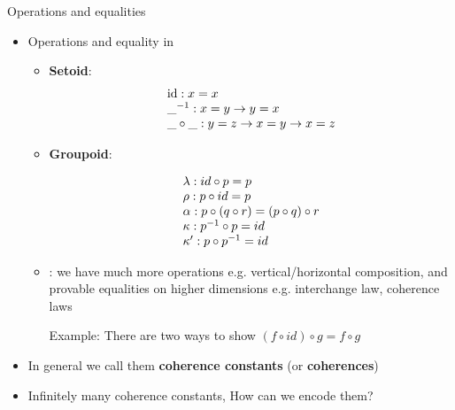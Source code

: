 \documentclass[12pt, mathserif,handout]{beamer}
\begin{document}
\begin{frame}[allowframebreaks,c]{Operations and equalities}

\begin{itemize}

\item Operations and equality in

\begin{itemize}

\item \textbf{Setoid}: 
\begin{equation*}
\begin{array}[b]{l} 
\text{id} : x = x \\
\_^{-1} : x= y \to y  = x \\
\_ \circ\_ : y = z \to x = y \to x = z
 \end{array}
\end{equation*}

\item \textbf{Groupoid}: 

\begin{equation*}
\begin{array}[b]{l}
\lambda : id \circ p = p \\
\rho : p \circ id = p \\
\alpha : p \circ (q \circ r) = (p \circ q) \circ r \\
\kappa : p^{-1}\circ p = id \\
\kappa' : p \circ p^{-1} = id
 \end{array}
\end{equation*}

\item \textbf{\wogs} : we have much more operations e.g. vertical/horizontal composition, and provable equalities on higher
  dimensions e.g. interchange law, coherence laws


Example: There are
   two ways to show $(f \circ id) \circ g = f \circ g$

\hspace{1cm}

\end{itemize}

\item In general we call them \textbf{coherence constants} (or \textbf{coherences})

\item Infinitely many coherence constants, How can we encode them?
\end{itemize}

\end{frame}
\end{document}
